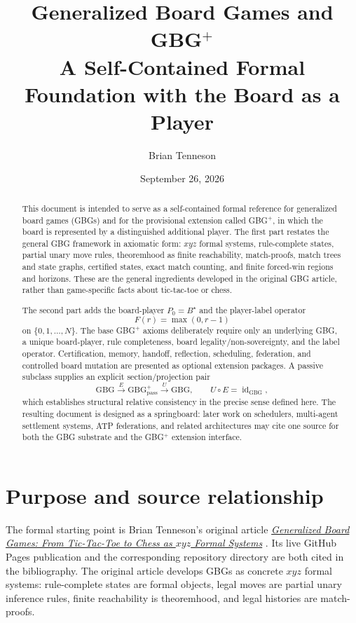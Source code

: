 \documentclass[11pt]{article}
\title{\textbf{Generalized Board Games and GBG$^{+}$}\\[0.45em]
\large A Self-Contained Formal Foundation with the Board as a Player}
\author{Brian Tenneson}
\date{September 26, 2026}
\theoremstyle{definition}
\theoremstyle{remark}
\newcommand{\GBG}{\mathrm{GBG}}
\newcommand{\GBGpass}{\mathrm{GBG}^{+}_{\mathrm{pass}}}
\newcommand{\id}{\operatorname{id}}
\begin{document}
\maketitle

\begin{abstract}
This document is intended to serve as a self-contained formal reference for generalized board games (GBGs) and for the provisional extension called GBG$^{+}$, in which the board is represented by a distinguished additional player.  The first part restates the general GBG framework in axiomatic form: $xyz$ formal systems, rule-complete states, partial unary move rules, theoremhood as finite reachability, match-proofs, match trees and state graphs, certified states, exact match counting, and finite forced-win regions and horizons.  These are the general ingredients developed in the original GBG article, rather than game-specific facts about tic-tac-toe or chess.

The second part adds the board-player $P_0=B^{\star}$ and the player-label operator
\[
F(r)=\max(0,r-1)
\]
on $\{0,1,\ldots,N\}$.  The base GBG$^{+}$ axioms deliberately require only an underlying GBG, a unique board-player, rule completeness, board legality/non-sovereignty, and the label operator.  Certification, memory, handoff, reflection, scheduling, federation, and controlled board mutation are presented as optional extension packages.  A passive subclass supplies an explicit section/projection pair
\[
\GBG\xrightarrow{E}\GBGpass\xrightarrow{U}\GBG,
\qquad U\circ E=\id_{\GBG},
\]
which establishes structural relative consistency in the precise sense defined here.  The resulting document is designed as a springboard: later work on schedulers, multi-agent settlement systems, ATP federations, and related architectures may cite one source for both the GBG substrate and the GBG$^{+}$ extension interface.
\end{abstract}

\section{Purpose and source relationship}

The formal starting point is Brian Tenneson's original article
\href{https://btenneson.github.io/pub/cs.LO_Logic_in_Computer_Science/generalized_board_games_tic_tac_toe_chess_001/}{\emph{Generalized Board Games: From Tic-Tac-Toe to Chess as $xyz$ Formal Systems}} \cite{TennesonGBG}.  Its live GitHub Pages publication and the corresponding repository directory are both cited in the bibliography.  The original article develops GBGs as concrete $xyz$ formal systems: rule-complete states are formal objects, legal moves are partial unary inference rules, finite reachability is theoremhood, and legal histories are match-proofs.
\end{document}
